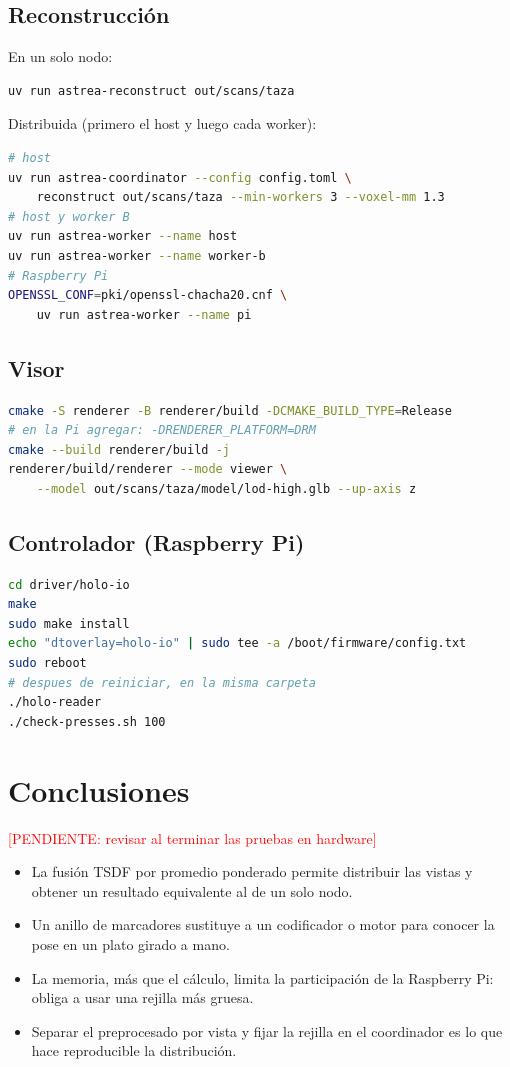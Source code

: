 \documentclass[journal]{IEEEtran}
\newcommand{\pendiente}[1]{\textcolor{red}{[PENDIENTE: #1]}}
\begin{document}
\subsection{Reconstrucción}
En un solo nodo:
\begin{lstlisting}[language=bash]
uv run astrea-reconstruct out/scans/taza
\end{lstlisting}
Distribuida (primero el host y luego cada worker):
\begin{lstlisting}[language=bash]
# host
uv run astrea-coordinator --config config.toml \
    reconstruct out/scans/taza --min-workers 3 --voxel-mm 1.3
# host y worker B
uv run astrea-worker --name host
uv run astrea-worker --name worker-b
# Raspberry Pi
OPENSSL_CONF=pki/openssl-chacha20.cnf \
    uv run astrea-worker --name pi
\end{lstlisting}

\subsection{Visor}
\begin{lstlisting}[language=bash]
cmake -S renderer -B renderer/build -DCMAKE_BUILD_TYPE=Release
# en la Pi agregar: -DRENDERER_PLATFORM=DRM
cmake --build renderer/build -j
renderer/build/renderer --mode viewer \
    --model out/scans/taza/model/lod-high.glb --up-axis z
\end{lstlisting}

\subsection{Controlador (Raspberry Pi)}
\begin{lstlisting}[language=bash]
cd driver/holo-io
make
sudo make install
echo "dtoverlay=holo-io" | sudo tee -a /boot/firmware/config.txt
sudo reboot
# despues de reiniciar, en la misma carpeta
./holo-reader
./check-presses.sh 100
\end{lstlisting}

\section{Conclusiones}
\pendiente{revisar al terminar las pruebas en hardware}
\begin{itemize}
  \item La fusión TSDF por promedio ponderado permite distribuir las vistas y
        obtener un resultado equivalente al de un solo nodo.
  \item Un anillo de marcadores sustituye a un codificador o motor para conocer
        la pose en un plato girado a mano.
  \item La memoria, más que el cálculo, limita la participación de la Raspberry
        Pi: obliga a usar una rejilla más gruesa.
  \item Separar el preprocesado por vista y fijar la rejilla en el coordinador es
        lo que hace reproducible la distribución.
\end{itemize}
\end{document}
